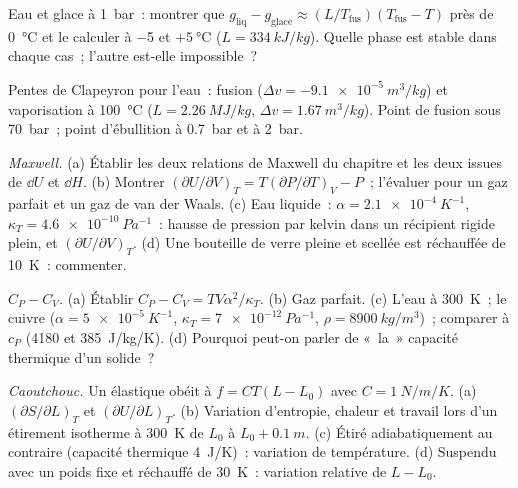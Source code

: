 \begin{exercise}[$\star$]\label{exo:b2:thermodynamic-potentials:3}
Eau et glace à \qty{1}{bar}~: montrer que $g_{\text{liq}} - g_{\text{glace}} \approx
(L/T_{\text{fus}})(T_{\text{fus}} - T)$ près de \qty{0}{\celsius} et le calculer
à \qty{-5}{} et $+\qty{5}{\celsius}$ ($L = \qty{334}{kJ/kg}$). Quelle phase est
stable dans chaque cas~; l'autre est-elle impossible~?
\end{exercise}

\begin{exercise}[$\star$]\label{exo:b2:thermodynamic-potentials:4}
Pentes de Clapeyron pour l'eau~: fusion ($\Delta v = -\qty{9.1e-5}{m^3/kg}$) et
vaporisation à \qty{100}{\celsius} ($L = \qty{2.26}{MJ/kg}$, $\Delta v =
\qty{1.67}{m^3/kg}$). Point de fusion sous \qty{70}{bar}~; point d'ébullition à
\qty{0.7}{bar} et à \qty{2}{bar}.
\end{exercise}

\begin{exercise}[$\star\star$]\label{exo:b2:thermodynamic-potentials:5}
\emph{Maxwell.} (a) Établir les deux relations de Maxwell du chapitre
et les deux issues de $\dd U$ et $\dd H$. (b) Montrer $(\partial U/\partial V)_T =
T(\partial P/\partial T)_V - P$~; l'évaluer pour un gaz parfait et un gaz de van
der Waals. (c) Eau liquide~: $\alpha = \qty{2.1e-4}{K^{-1}}$, $\kappa_T =
\qty{4.6e-10}{Pa^{-1}}$~: hausse de pression par kelvin dans un récipient rigide plein,
et $(\partial U/\partial V)_T$. (d) Une bouteille de verre pleine et scellée est réchauffée
de \qty{10}{K}~: commenter.
\end{exercise}

\begin{exercise}[$\star\star$]\label{exo:b2:thermodynamic-potentials:6}
\emph{$C_P - C_V$.} (a) Établir $C_P - C_V = TV\alpha^2/\kappa_T$. (b)
Gaz parfait. (c) L'eau à \qty{300}{K}~; le cuivre ($\alpha = \qty{5e-5}{K^{-1}}$,
$\kappa_T = \qty{7e-12}{Pa^{-1}}$, $\rho = \qty{8900}{kg/m^3}$)~; comparer à
$c_P$ (\qty{4180}{} et \qty{385}{J/kg/K}). (d) Pourquoi peut-on parler de
«~la~» capacité thermique d'un solide~?
\end{exercise}

\begin{exercise}[$\star\star$]\label{exo:b2:thermodynamic-potentials:7}
\emph{Caoutchouc.} Un élastique obéit à $f = CT(L - L_0)$ avec $C = \qty{1}{N/m/K}$.
(a) $(\partial S/\partial L)_T$ et $(\partial U/\partial L)_T$. (b) Variation
d'entropie, chaleur et travail lors d'un étirement isotherme à \qty{300}{K} de
$L_0$ à $L_0 + \qty{0.1}{m}$. (c) Étiré adiabatiquement au contraire (capacité
thermique \qty{4}{J/K})~: variation de température. (d) Suspendu avec un poids fixe
et réchauffé de \qty{30}{K}~: variation relative de $L - L_0$.
\end{exercise}

